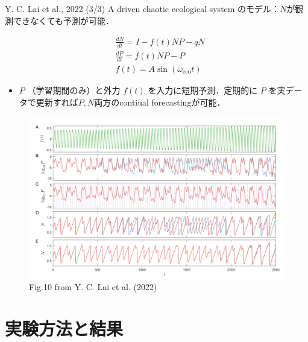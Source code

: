 \begin{frame}{Y. C. Lai et al., 2022 (3/3)}
    A driven chaotic ecological system のモデル：$N$が観測できなくても予測が可能．
    \begin{minipage}{0.35\textwidth}\vspace{-1.0cm}
        \begin{align}
            & \frac{d N}{d t}=I-f(t) N P-q N \\
            & \frac{d P}{d t}=f(t) N P-P\\
            & f(t)=A \sin \left(\omega_{\mathrm{eco}} t\right)
        \end{align}
        \vspace{-.4cm}
        \begin{itemize}
            \item $P$ （学習期間のみ）と外力 $f(t)$ を入力に短期予測．定期的に $P$ を実データで更新すれば$P, N$両方のcontiual forecastingが可能．
        \end{itemize}
    \end{minipage}
    \begin{minipage}{0.64\textwidth}
        \begin{figure}
            \includegraphics[width=\textwidth]{Fig/Fig.10_Lai.png}
            \caption*{Fig.10 from Y. C. Lai et al. (2022)}
            \label{Fig.10_Lai.png} %
        \end{figure}
    \end{minipage}
\end{frame}

\section{実験方法と結果}

